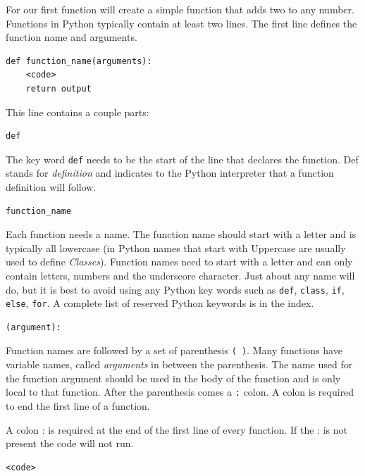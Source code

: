 \documentclass{book}
\begin{document}
    
        For our first function will create a simple function that adds two to
any number. Functions in Python typically contain at least two lines.
The first line defines the function name and arguments.

\begin{lstlisting}
def function_name(arguments):
    <code>
    return output
\end{lstlisting}

This line contains a couple parts:

\begin{lstlisting}
def
\end{lstlisting}

The key word \lstinline!def! needs to be the start of the line that
declares the function. Def stands for \emph{definition} and indicates to
the Python interpreter that a function definition will follow.

\begin{lstlisting}
function_name
\end{lstlisting}

Each function needs a name. The function name should start with a letter
and is typically all lowercase (in Python names that start with
Uppercase are usually used to define \emph{Classes}). Function names
need to start with a letter and can only contain letters, numbers and
the underscore character. Just about any name will do, but it is best to
avoid using any Python key words such as \lstinline!def!,
\lstinline!class!, \lstinline!if!, \lstinline!else!, \lstinline!for!. A
complete list of reserved Python keywords is in the index.

\begin{lstlisting}
(argument):
\end{lstlisting}

Function names are followed by a set of parenthesis \lstinline!( )!.
Many functions have variable names, called \emph{arguments} in between
the parenthesis. The name used for the function argument should be used
in the body of the function and is only local to that function. After
the parenthesis comes a \lstinline!:! colon. A colon is required to end
the first line of a function.

A colon : is required at the end of the first line of every function. If
the : is not present the code will not run.

\begin{lstlisting}
<code>
\end{lstlisting}
\end{document}
